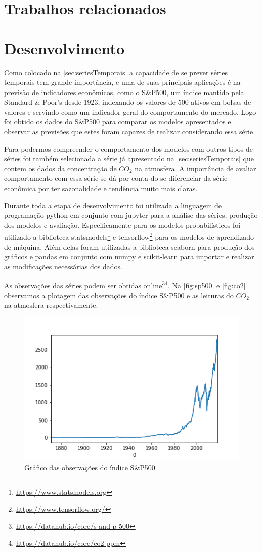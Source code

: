 \documentclass[
    12pt,
    oneside,
    a4paper,
    english,
    brazil
]{abntex2}
\begin{document}
\chapter{Trabalhos relacionados}


\chapter{Desenvolvimento}\label{chap:desenv}
Como colocado na \autoref{sec:seriesTemporais} a capacidade de se prever séries
temporais tem  grande importância,  e uma  de suas  principais aplicações  é na
previsão  de indicadores  econômicos, como  o S\&P500,  um índice  mantido pela
Standard \& Poor's desde 1923, indexando os  valores de 500 ativos em bolsas de
valores e  servindo como um indicador  geral do comportamento do  mercado. Logo
foi obtido os dados do S\&P500 para comparar os modelos apresentados e observar
as previsões que estes foram capazes de realizar considerando essa série.

Para   podermos   compreender   o   comportamento  dos   modelos   com   outros
tipos   de  séries   foi  também   selecionada  a   série  já   apresentado  na
\autoref{sec:seriesTemporais} que contem os dados  da concentração de $CO_2$ na
atmosfera. A  importância de  avaliar comportamento  com essa  série se  dá por
conta do  se diferenciar da  série econômica  por ter sazonalidade  e tendência
muito mais claras.

Durante  toda  a  etapa  de   desenvolvimento  foi  utilizada  a  linguagem  de
programação python em conjunto com jupyter  para a análise das séries, produção
dos modelos  e avaliação. Especificamente  para os modelos  probabilísticos foi
utilizado a  biblioteca statsmodels\footnote{\url{https://www.statsmodels.org}}
e  tensorflow\footnote{\url{https://www.tensorflow.org/}}  para os  modelos  de
aprendizado de máquina.  Além delas foram utilizadas a  biblioteca seaborn para
produção  dos gráficos  e  pandas em  conjunto com  numpy  e scikit-learn  para
importar e realizar as modificações necessárias dos dados.

As observações das séries podem ser obtidas
online\footnote{\url{https://datahub.io/core/s-and-p-500}}\footnote{\url{https://datahub.io/core/co2-ppm}}.
Na   \autoref{fig:sp500}  e   \autoref{fig:co2}  observamos   a  plotagem   das
observações  do   índice  S\&P500  e   as  leituras  do  $CO_2$   na  atmosfera
respectivamente.

\begin{figure}[ht]
    \centering
    \caption{Gráfico das observações do índice S\&P500}\label{fig:sp500}
    \includegraphics[width=.5\linewidth]{images/sp500.png}
\end{figure}
\end{document}
